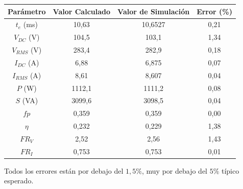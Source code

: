 \documentclass[11pt]{article}
\begin{document}
\begin{center}
\begin{tabular}{c c c c}
Par\'ametro & Valor Calculado & Valor de Simulaci\'on & Error (\%) \\ \hline
$t_e$ (ms) & 10{,}63 & 10{,}6527 & 0{,}21 \\
$V_{DC}$ (V) & 104{,}5 & 103{,}1 & 1{,}34 \\
$V_{RMS}$ (V) & 283{,}4 & 282{,}9 & 0{,}18 \\
$I_{DC}$ (A) & 6{,}88 & 6{,}875 & 0{,}07 \\
$I_{RMS}$ (A) & 8{,}61 & 8{,}607 & 0{,}04 \\
$P$ (W) & 1112{,}1 & 1111{,}2 & 0{,}08 \\
$S$ (VA) & 3099{,}6 & 3098{,}5 & 0{,}04 \\
$fp$ & 0{,}359 & 0{,}359 & 0{,}00 \\
$\eta$ & 0{,}232 & 0{,}229 & 1{,}38 \\
$FR_V$ & 2{,}52 & 2{,}56 & 1{,}43 \\
$FR_I$ & 0{,}753 & 0{,}753 & 0{,}01 \\
\end{tabular}
\end{center}

Todos los errores est\'an por debajo del $1{,}5\%$, muy por debajo del
$5\%$ t\'ipico esperado.
\end{document}
